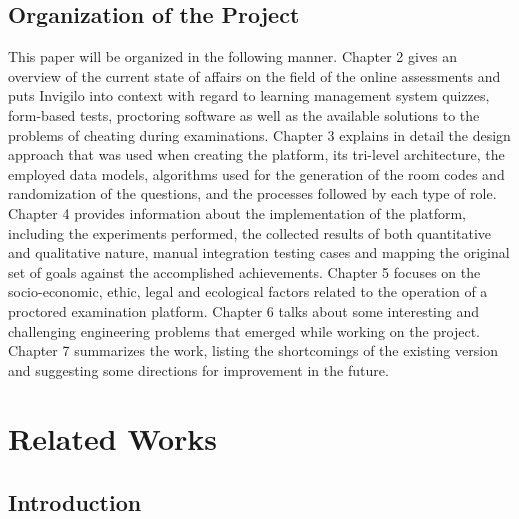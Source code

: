 \documentclass[12pt, a4paper]{report}
\begin{document}
\section{Organization of the Project}

\begin{justify}
  {\fontsize{12}{18}\selectfont
    This paper will be organized in the following manner. Chapter 2 gives an overview of the current state of affairs on the field of the online assessments and puts Invigilo into context with regard to learning management system quizzes, form-based tests, proctoring software as well as the available solutions to the problems of cheating during examinations. Chapter 3 explains in detail the design approach that was used when creating the platform, its tri-level architecture, the employed data models, algorithms used for the generation of the room codes and randomization of the questions, and the processes followed by each type of role. Chapter 4 provides information about the implementation of the platform, including the experiments performed, the collected results of both quantitative and qualitative nature, manual integration testing cases and mapping the original set of goals against the accomplished achievements. Chapter 5 focuses on the socio-economic, ethic, legal and ecological factors related to the operation of a proctored examination platform. Chapter 6 talks about some interesting and challenging engineering problems that emerged while working on the project. Chapter 7 summarizes the work, listing the shortcomings of the existing version and suggesting some directions for improvement in the future.
  }
\end{justify}

\chapter{Related Works}

\section{Introduction}
\end{document}
